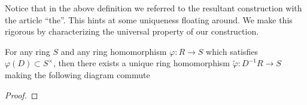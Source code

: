 \documentclass[master.tex]{subfiles}
\begin{document}
  Notice that in the above definition we referred to the resultant construction with the article ``the''. This hints at
  some uniqueness floating around. We make this rigorous by characterizing the universal property of our construction.
  \begin{prop}
    For any ring \(S\) and any ring homomorphism \(\varphi \colon R \to S\) which satisfies \(\varphi(D) \subset
    S^\times\), then there exists a unique ring homomorphism \(\tilde{\varphi} \colon D^{-1}R \to S\) making the
    following diagram commute
    \begin{figure}[h]
      \centering
    \end{figure}
  \end{prop}
  \begin{proof}
    
  \end{proof}
\end{document}
